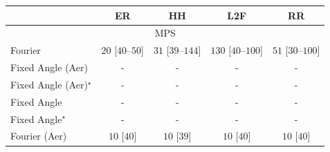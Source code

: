 \begin{tabular}{l|cccc|}
\toprule
            & ER & HH & L2F & RR \\
\midrule
\multicolumn{5}{c}{\rule{0pt}{8pt}MPS} \\
\midrule
Fourier & {\cellcolor[HTML]{F4FBF1}} \color[HTML]{000000} $20$ [$40$--$50$] & {\cellcolor[HTML]{F2FAEF}} \color[HTML]{000000} $31$ [$39$--$144$] & {\cellcolor[HTML]{DCF2D7}} \color[HTML]{000000} $130$ [$40$--$100$] & {\cellcolor[HTML]{EFF9EB}} \color[HTML]{000000} $51$ [$30$--$100$] \\
Fixed Angle (Aer) & {\cellcolor[HTML]{000000}} \color[HTML]{F1F1F1} {\cellcolor{white}} \color{black} - & {\cellcolor[HTML]{000000}} \color[HTML]{F1F1F1} {\cellcolor{white}} \color{black} - & {\cellcolor[HTML]{000000}} \color[HTML]{F1F1F1} {\cellcolor{white}} \color{black} - & {\cellcolor[HTML]{000000}} \color[HTML]{F1F1F1} {\cellcolor{white}} \color{black} - \\
Fixed Angle (Aer)$^\star$ & {\cellcolor[HTML]{000000}} \color[HTML]{F1F1F1} {\cellcolor{white}} \color{black} - & {\cellcolor[HTML]{000000}} \color[HTML]{F1F1F1} {\cellcolor{white}} \color{black} - & {\cellcolor[HTML]{000000}} \color[HTML]{F1F1F1} {\cellcolor{white}} \color{black} - & {\cellcolor[HTML]{000000}} \color[HTML]{F1F1F1} {\cellcolor{white}} \color{black} - \\
Fixed Angle & {\cellcolor[HTML]{000000}} \color[HTML]{F1F1F1} {\cellcolor{white}} \color{black} - & {\cellcolor[HTML]{000000}} \color[HTML]{F1F1F1} {\cellcolor{white}} \color{black} - & {\cellcolor[HTML]{000000}} \color[HTML]{F1F1F1} {\cellcolor{white}} \color{black} - & {\cellcolor[HTML]{000000}} \color[HTML]{F1F1F1} {\cellcolor{white}} \color{black} - \\
Fixed Angle$^\star$ & {\cellcolor[HTML]{000000}} \color[HTML]{F1F1F1} {\cellcolor{white}} \color{black} - & {\cellcolor[HTML]{000000}} \color[HTML]{F1F1F1} {\cellcolor{white}} \color{black} - & {\cellcolor[HTML]{000000}} \color[HTML]{F1F1F1} {\cellcolor{white}} \color{black} - & {\cellcolor[HTML]{000000}} \color[HTML]{F1F1F1} {\cellcolor{white}} \color{black} - \\
Fourier (Aer) & {\cellcolor[HTML]{F6FCF4}} \color[HTML]{000000} $10$ [$40$] & {\cellcolor[HTML]{F6FCF4}} \color[HTML]{000000} $10$ [$39$] & {\cellcolor[HTML]{F6FCF4}} \color[HTML]{000000} $10$ [$40$] & {\cellcolor[HTML]{F6FCF4}} \color[HTML]{000000} $10$ [$40$] \\

\end{tabular}
